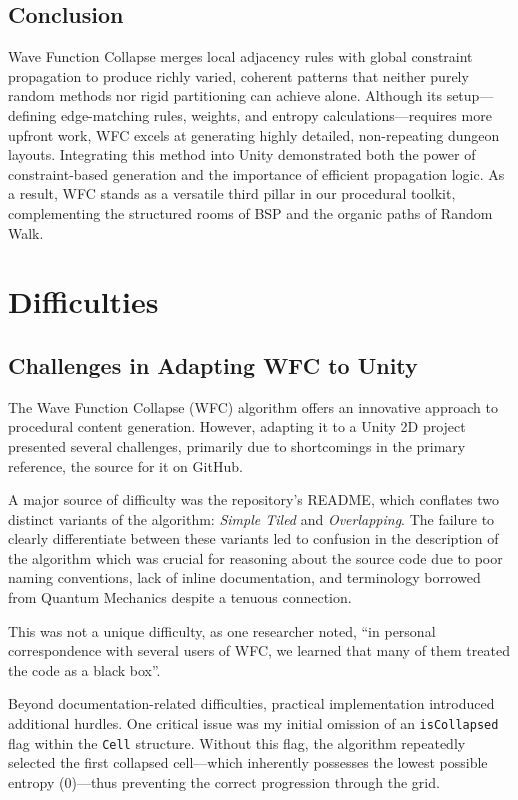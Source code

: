 \documentclass[a4paper, 12pt, one column, aas_macros]{article}
\begin{document}
\subsection{Conclusion}
Wave Function Collapse merges local adjacency rules with global constraint propagation to produce richly varied, coherent patterns that neither purely random methods nor rigid partitioning can achieve alone. Although its setup---defining edge-matching rules, weights, and entropy calculations---requires more upfront work, WFC excels at generating highly detailed, non-repeating dungeon layouts. Integrating this method into Unity demonstrated both the power of constraint-based generation and the importance of efficient propagation logic. As a result, WFC stands as a versatile third pillar in our procedural toolkit, complementing the structured rooms of BSP and the organic paths of Random Walk.

\section{Difficulties}
\subsection{Challenges in Adapting WFC to Unity}
The Wave Function Collapse (WFC) algorithm offers an innovative approach to procedural content generation. However, adapting it to a Unity 2D project presented several challenges, primarily due to shortcomings in the primary reference, the source for it on GitHub. \citep{mxgmn}

A major source of difficulty was the repository's README, which conflates two distinct variants of the algorithm: \emph{Simple Tiled} and \emph{Overlapping}. The failure to clearly differentiate between these variants led to confusion in the description of the algorithm which was crucial for reasoning about the source code due to poor naming conventions, lack of inline documentation, and terminology borrowed from Quantum Mechanics despite a tenuous connection.

This was not a unique difficulty, as one researcher noted, ``in personal correspondence with several users of WFC, we learned that many of them treated the code as a black box''. \citep{karth}

Beyond documentation-related difficulties, practical implementation introduced additional hurdles. One critical issue was my initial omission of an \texttt{isCollapsed} flag within the \texttt{Cell} structure. Without this flag, the algorithm repeatedly selected the first collapsed cell---which inherently possesses the lowest possible entropy (0)---thus preventing the correct progression through the grid.
\end{document}
